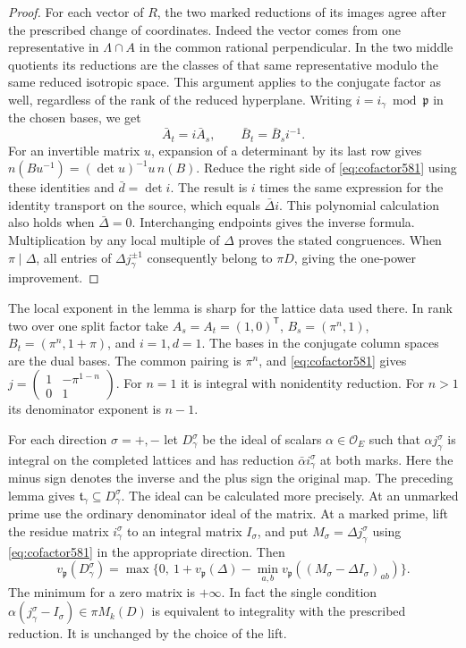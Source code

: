 \documentclass[a4paper,11pt]{article}
\theoremstyle{definition}
\theoremstyle{remark}
\numberwithin{equation}{section}
\begin{document}
\begin{proof}
For each vector of \(R\), the two marked reductions of its images
agree after the prescribed change of coordinates. Indeed the
vector comes from one representative in \(\Lambda\cap A\) in
the common rational perpendicular. In the two middle quotients
its reductions are the classes of that same representative
modulo the same reduced isotropic space. This argument applies
to the conjugate factor as well, regardless of the rank of
the reduced hyperplane. Writing \(i=i_\gamma\bmod\mathfrak p\)
in the chosen bases, we get
\[
    \bar A_t=i\bar A_s,\qquad \bar B_t=\bar B_s i^{-1}.
\]
For an invertible matrix \(u\), expansion of a determinant by
its last row gives \(n(Bu^{-1})=(\det u)^{-1}u\,n(B)\).
Reduce the right side of \eqref{eq:cofactor581} using these
identities and \(\bar d=\det i\). The result is \(i\) times the
same expression for the identity transport on the source,
which equals \(\bar\Delta i\). This polynomial calculation
also holds when \(\bar\Delta=0\). Interchanging endpoints gives
the inverse formula. Multiplication by any local multiple of
\(\Delta\) proves the stated congruences. When \(\pi\mid\Delta\),
all entries of \(\Delta j_\gamma^{\pm1}\) consequently belong
to \(\pi D\), giving the one-power improvement.
\end{proof}

The local exponent in the lemma is sharp for the lattice data
used there. In rank two over one split factor take \(A_s=A_t=(1,0)^{\mathsf T}\),
\(B_s=(\pi^n,1)\), \(B_t=(\pi^n,1+\pi)\), and \(i=1,d=1\).
The bases in the conjugate column spaces are the dual bases.
The common pairing is \(\pi^n\), and
\eqref{eq:cofactor581} gives
\(j=\left(\begin{smallmatrix}1&-\pi^{1-n}\\0&1\end{smallmatrix}\right)\).
For \(n=1\) it is integral with nonidentity reduction. For
\(n>1\) its denominator exponent is \(n-1\).

For each direction \(\sigma=+,-\) let \(D_\gamma^\sigma\)
be the ideal of scalars \(\alpha\in\mathcal O_E\) such that
\(\alpha j_\gamma^\sigma\) is integral on the completed lattices
and has reduction \(\bar\alpha i_\gamma^\sigma\) at both marks.
Here the minus sign denotes the inverse and the plus sign
the original map. The preceding lemma gives
\(\mathfrak t_\gamma\subseteq D_\gamma^\sigma\).
The ideal can be calculated more precisely. At an unmarked prime
use the ordinary denominator ideal of the matrix. At a marked
prime, lift the residue matrix \(i_\gamma^\sigma\) to an integral
matrix \(I_\sigma\), and put \(M_\sigma=\Delta j_\gamma^\sigma\)
using \eqref{eq:cofactor581} in the appropriate direction.
Then
\[
  v_{\mathfrak p}(D_\gamma^\sigma)=
  \max\{0,\ 1+v_{\mathfrak p}(\Delta)
                -\min_{a,b}v_{\mathfrak p}
                   ((M_\sigma-\Delta I_\sigma)_{ab})\}.
\]
The minimum for a zero matrix is \(+\infty\). In fact the single
condition \(\alpha(j_\gamma^\sigma-I_\sigma)\in\pi M_k(D)\)
is equivalent to integrality with the prescribed reduction.
It is unchanged by the choice of the lift.
\end{document}

